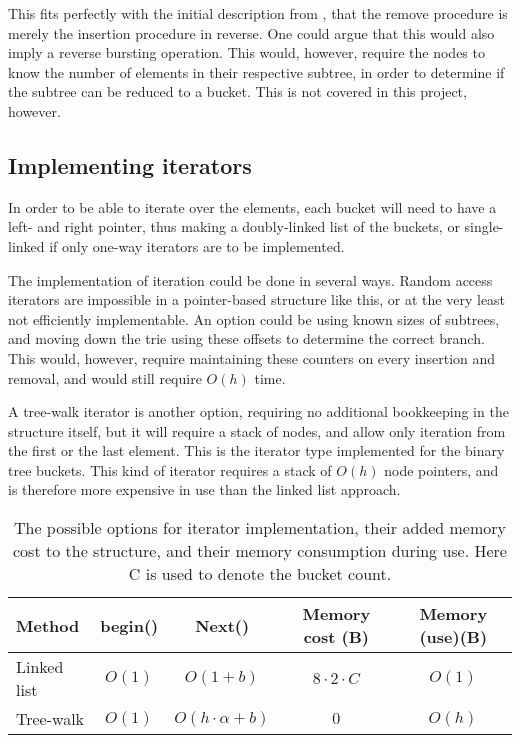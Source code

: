 This fits perfectly with the initial description from \cite{Nash:2008}, that
the remove procedure is merely the insertion procedure in reverse. One could argue
that this would also imply a reverse bursting operation. This would, however,
require the nodes to know the number of elements in their respective subtree,
in order to determine if the subtree can be reduced to a bucket.
This is not covered in this project, however.


\subsection{Implementing iterators}
In order to be able to iterate over the elements, each bucket will need
to have a {\keyword left}- and {\keyword right} pointer, thus making a
doubly-linked list of the buckets, or single-linked if only one-way iterators
are to be implemented.

The implementation of iteration could be done in several ways. Random access
iterators are impossible in a pointer-based structure like this, or at the very
least not efficiently implementable. An option could be using known sizes of
subtrees, and moving down the trie using these offsets to determine the correct
branch. This would, however, require maintaining these counters on every
insertion and removal, and would still require $O(h)$ time.

A tree-walk iterator is another option, requiring no additional bookkeeping in
the structure itself, but it will require a stack of nodes, and allow only
iteration from the first or the last element. This is the iterator type
implemented for the binary tree buckets. This kind of iterator requires a stack
of $O(h)$ node pointers, and is therefore more expensive in use than the linked
list approach.

\begin{table}[h!]
    \centering
    \begin{tabular}[here]{ l | c | c | c | c}
        Method      & begin()  & Next()           & Memory cost (B) & Memory (use)(B) \\ \hline
        Linked list  & $O(1)$ & $O(1 + b) $        & $8\cdot2\cdot C$      & $O(1)$ \\
        Tree-walk & $O(1)$ & $O(h \cdot \alpha + b)$   & $0$             & $O(h)$ \\ \hline
    \end{tabular}
    \caption{The possible options for iterator implementation, their added
    memory cost to the structure, and their memory consumption during use. Here
    C is used to denote the bucket count.}

    \label{tab:stats:iterator}
\end{table}

